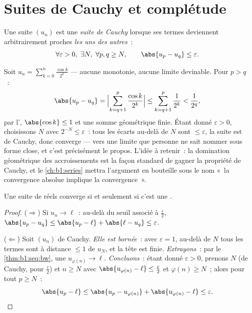 \section{Suites de Cauchy et complétude}

\begin{definition}\label{def:b1:seq:cauchy}
Une suite $(u_n)$ est une \emph{suite de Cauchy} lorsque ses termes deviennent arbitrairement proches
\emph{les uns des autres}~:
\[
\forall \varepsilon > 0,\ \exists N,\ \forall p, q \geq N,
\qquad \abs{u_p - u_q} \leq \varepsilon .
\]
\end{definition}

\begin{example}\label{ex:b1:seq:cauchyhand}
Soit $u_n = \sum_{k=0}^{n} \frac{\cos k}{2^k}$ --- aucune monotonie,
aucune limite devinable. Pour $p > q$~:
\[
\abs{u_p - u_q}
= \Bigl| \sum_{k=q+1}^{p} \frac{\cos k}{2^k} \Bigr|
\leq \sum_{k=q+1}^{p} \frac{1}{2^k}
< \frac{1}{2^{q}} ,
\]
par l', $\abs{\cos k} \leq 1$ et une somme
géométrique finie. Étant donné $\varepsilon > 0$, choisissons $N$ avec
$2^{-N} \leq \varepsilon$~: tous les écarts au-delà de $N$ sont $\leq
\varepsilon$, la suite est de Cauchy, donc converge --- vers une
limite que personne ne sait nommer sous forme close, et c'est
précisément le propos. L'idée à retenir~: la domination géométrique
des accroissements est la façon standard de gagner la propriété de
Cauchy, et le \cref{ch:b1:series} mettra l'argument en bouteille sous
le nom «~la convergence absolue implique la convergence~».
\end{example}

\begin{theorem}[Complétude de $\R$]\label{thm:b1:seq:complete}
Une suite de réels converge si et seulement si c'est une .
\end{theorem}

\begin{proof}
($\Rightarrow$) Si $u_n \to \ell$~: au-delà du seuil associé à
$\frac\varepsilon2$, $\abs{u_p - u_q} \leq \abs{u_p - \ell} +
\abs{\ell - u_q} \leq \varepsilon$.

($\Leftarrow$) Soit $(u_n)$ de Cauchy. \emph{Elle est bornée}~: avec
$\varepsilon = 1$, au-delà de $N$ tous les termes sont à distance
$\leq 1$ de $u_N$, et la tête est finie. \emph{Extrayons}~: par le
\cref{thm:b1:seq:bw}, une  $u_{\varphi(n)} \to \ell$.
\emph{Concluons}~: étant donné $\varepsilon > 0$, prenons $N$ (de
Cauchy, pour $\frac\varepsilon2$) et $n \geq N$ avec
$\abs{u_{\varphi(n)} - \ell} \leq \frac\varepsilon2$ et $\varphi(n)
\geq N$~; alors pour tout $p \geq N$~:
\[
\abs{u_p - \ell} \leq \abs{u_p - u_{\varphi(n)}} +
\abs{u_{\varphi(n)} - \ell} \leq \varepsilon . \qedhere
\]
\end{proof}

